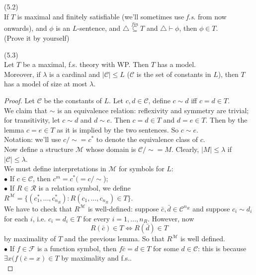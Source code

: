 \documentclass[a4paper]{article}
\begin{document}
\begin{lemma} (5.2)\\
    If $T$ is maximal and finitely satisfiable (we'll sometimes use \emph{f.s.} from now onwards), and $\phi$ is an $L$-sentence, and $\triangle \stackrel{fin}{\subseteq} T$ and $\triangle \vdash \phi$, then $\phi \in T$.\\
    (Prove it by yourself)
\end{lemma}

\begin{lemma} (5.3)\\
    Let $T$ be a maximal, f.s. theory with WP. Then $T$ has a model.\\
    Moreover, if $\lambda$ is a cardinal and $|\mathcal{C}| \leq L$ ($\mathcal{C}$ is the set of constants in $L$), then $T$ has a model of size at most $\lambda$.
    \begin{proof}
        Let $\mathcal{C}$ be the constants of $L$. Let $c,d \in \mathcal{C}$, define $c \sim d$ iff $c=d \in T$.\\
        We claim that $\sim$ is an equivalence relation: reflexivity and symmetry are trivial; for transitivity, let $c \sim d$ and $d \sim e$. Then $c=d \in T$ and $d=e \in T$. Then by the lemma $c=e\in T$ as it is implied by the two sentences. So $c \sim e$.\\
        Notation: we'll use $c/\sim = c^*$ to denote the equivalence class of $c$.\\
        Now define a structure $\mathcal{M}$ whose domain is $\mathcal{C}/\sim = M$. Clearly, $|M| \leq \lambda$ if $|\mathcal{C}| \leq \lambda$.\\
        We must define interpretations in $\mathcal{M}$ for symbols for $L$:\\
        $\bullet$ If $c \in \mathcal{C}$, then $c^m = c^* (=c/\sim$);\\
        $\bullet$ If $R \in \mathcal{R}$ is a relation symbol, we define $R^{\mathcal{M}} = \{(c_1^*,...,c_{n_R}^*):R(c_1,...,c_{n_R}) \in T\}$.\\
        We have to check that $R^{\mathcal{M}}$ is well-defined: suppose $\bar{c},\bar{d} \in \mathcal{C}^{n_R}$ and suppose $c_i \sim d_i$ for each $i$, i.e. $c_i = d_i \in T$ for every $i=1,...,n_R$. However, now
        $$R(\bar{c}) \in T \iff R(\bar{d}) \in T$$
        by maximality of $T$ and the previous lemma. So that $R^{\mathcal{M}}$ is well defined.\\
        $\bullet$ If $f \in \mathcal{F}$ is a function symbol, then $f\bar{c} = d \in T$ for some $d \in \mathcal{C}$: this is because $\exists x(f(\bar{c}=x) \in T$ by maximality and f.s..\\

\end{proof}
\end{lemma}
\end{document}
